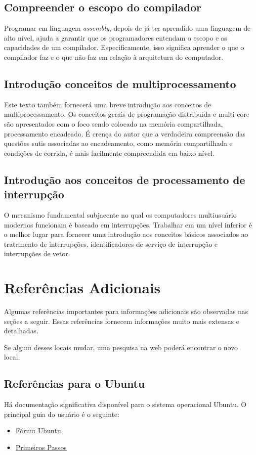 \subsection{Compreender o escopo do compilador}
Programar em linguagem \textit{assembly}, depois de já ter aprendido uma linguagem de alto nível, ajuda a garantir que os programadores entendam o escopo e as capacidades de um compilador. Especificamente, isso significa aprender o que o compilador faz e o que não faz em relação à arquitetura do computador.

\subsection{Introdução conceitos de multiprocessamento}
Este texto também fornecerá uma breve introdução aos conceitos de multiprocessamento. Os conceitos gerais de programação distribuída e multi-core são apresentados com o foco sendo colocado na memória compartilhada, processamento encadeado. É crença do autor que a verdadeira compreensão das questões sutis associadas ao encadeamento, como memória compartilhada e condições de corrida, é mais facilmente compreendida em baixo nível.

\subsection{Introdução aos conceitos de processamento de interrupção}
O mecanismo fundamental subjacente no qual os computadores multiusuário modernos funcionam é baseado em interrupções. Trabalhar em um nível inferior é o melhor lugar para fornecer uma introdução aos conceitos básicos associados ao tratamento de interrupções, identificadores de serviço de interrupção e interrupções de vetor.

\section{Referências Adicionais}
Algumas referências importantes para informações adicionais são observadas nas seções a seguir. Essas referências fornecem informações muito mais extensas e detalhadas.

Se algum desses locais mudar, uma pesquisa na web poderá encontrar o novo local.

\subsection{Referências para o Ubuntu}
Há documentação significativa disponível para o sistema operacional Ubuntu. O principal guia do usuário é o seguinte:
\begin{itemize}
	\item \href{https://ubuntuforum-br.org/}{Fórum Ubuntu}
	\item \href{https://help.ubuntu.com/stable/ubuntu-help/getting-started.html}{Primeiros Passos}
\end{itemize}

